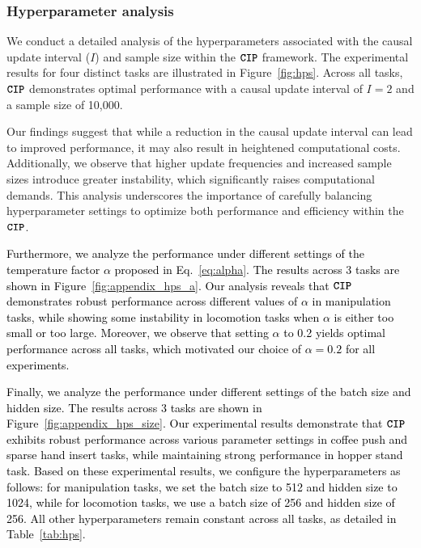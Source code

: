 \subsubsection{Hyperparameter analysis}
We conduct a detailed analysis of the hyperparameters associated with the causal update interval (\(I\)) and sample size within the $\texttt{\textbf{CIP}}$ framework. The experimental results for four distinct tasks are illustrated in Figure~\ref{fig:hps}. Across all tasks,  $\texttt{\textbf{CIP}}$ demonstrates optimal performance with a causal update interval of \(I = 2\) and a sample size of 10,000. 

Our findings suggest that while a reduction in the causal update interval can lead to improved performance, it may also result in heightened computational costs. Additionally, we observe that higher update frequencies and increased sample sizes introduce greater instability, which significantly raises computational demands. This analysis underscores the importance of carefully balancing hyperparameter settings to optimize both performance and efficiency within the $\texttt{\textbf{CIP}}$.

\textcolor{black}{Furthermore, we analyze the performance under different settings of the temperature factor $\alpha$ proposed in Eq.~\ref{eq:alpha}. The results across $3$ tasks are shown in Figure~\ref{fig:appendix_hps_a}. Our analysis reveals that $\texttt{\textbf{CIP}}$ demonstrates robust performance across different values of $\alpha$ in manipulation tasks, while showing some instability in locomotion tasks when $\alpha$ is either too small or too large. Moreover, we observe that setting $\alpha$ to 0.2 yields optimal performance across all tasks, which motivated our choice of $\alpha = 0.2$ for all experiments.}

\textcolor{black}{Finally, we analyze the performance under different settings of the batch size and hidden size. The results across $3$ tasks are shown in Figure~\ref{fig:appendix_hps_size}. Our experimental results demonstrate that $\texttt{\textbf{CIP}}$ exhibits robust performance across various parameter settings in coffee push and sparse hand insert tasks, while maintaining strong performance in hopper stand task. 
Based on these experimental results, we configure the hyperparameters as follows: for manipulation tasks, we set the batch size to 512 and hidden size to 1024, while for locomotion tasks, we use a batch size of 256 and hidden size of 256. All other hyperparameters remain constant across all tasks, as detailed in Table~\ref{tab:hps}.}

